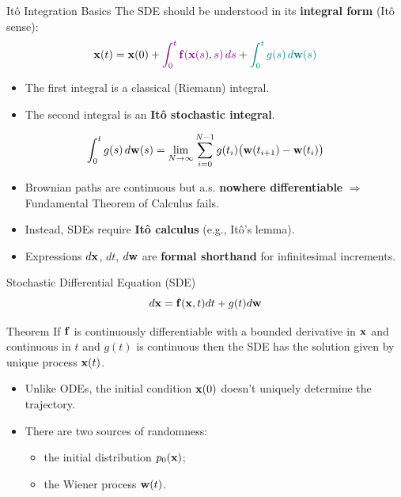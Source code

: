 \documentclass{beamer}
\begin{document}
\begin{frame}{It\^{o} Integration Basics}
	The SDE should be understood in its \textbf{integral form} (It\^{o} sense):
	\[
		\mathbf{x}(t) = \mathbf{x}(0) + {\color{violet}\int_0^t \mathbf{f}(\mathbf{x}(s), s) \, ds} + {\color{teal}\int_0^t g(s) \, d\mathbf{w}(s)}
	\]
	\eqpause
	\vspace{-0.5cm}
	\begin{itemize}
		\item {\color{violet}The first integral} is a classical (Riemann) integral.
		\item {\color{teal}The second integral} is an \textbf{It\^{o} stochastic integral}.
	\end{itemize}
	\eqpause
	\[
		\int_0^t g(s) \, d\mathbf{w}(s) = \lim_{N \to \infty} \sum_{i=0}^{N-1} g(t_i) \bigl(\mathbf{w}(t_{i+1}) - \mathbf{w}(t_i)\bigr)
	\]
	\vspace{-0.3cm}
	\begin{itemize}
		\item Brownian paths are continuous but a.s. \textbf{nowhere differentiable} $\Rightarrow$ Fundamental Theorem of Calculus fails.
		\item Instead, SDEs require \textbf{It\^{o} calculus} (e.g., It\^{o}'s lemma).
		\item Expressions $d\mathbf{x}$, $dt$, $d\mathbf{w}$ are \textbf{formal shorthand} for infinitesimal increments.
	\end{itemize}
\end{frame}
\begin{frame}{Stochastic Differential Equation (SDE)}
	\[
		d\mathbf{x} = \mathbf{f}(\mathbf{x}, t) dt + g(t) d \mathbf{w}
	\]
	\begin{block}{Theorem}
		If $\mathbf{f}$ is continuously differentiable with a bounded derivative in $\mathbf{x}$ 
		and continuous in $t$ and $g(t)$ is continuous then the SDE has the solution given by unique process $\mathbf{x}(t)$.
	\end{block}
	\eqpause
	\begin{itemize}
		\item Unlike ODEs, the initial condition $\mathbf{x}(0)$ doesn't uniquely determine the trajectory.
		\item There are two sources of randomness: 
		\begin{itemize}
			\item the initial distribution $p_0(\mathbf{x})$;
			\item the Wiener process $\mathbf{w}(t)$.
		\end{itemize}
	\end{itemize}
\end{frame}
\end{document}

